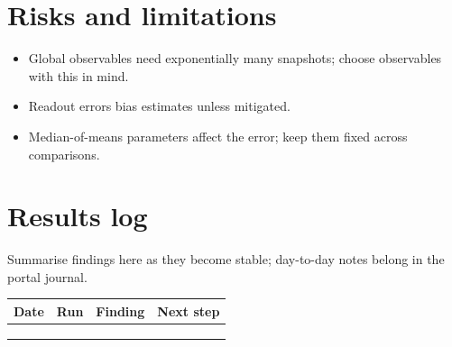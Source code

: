 \documentclass[11pt,a4paper]{article}
\begin{document}
\section{Risks and limitations}
\begin{itemize}
  \item Global observables need exponentially many snapshots; choose observables with this in mind.
  \item Readout errors bias estimates unless mitigated.
  \item Median-of-means parameters affect the error; keep them fixed across comparisons.
\end{itemize}

\section{Results log}
\label{sec:log}
Summarise findings here as they become stable; day-to-day notes belong in the portal journal.

\begin{table}[h]
\centering\small
\begin{tabularx}{\linewidth}{@{}l l >{\raggedright}X >{\raggedright\arraybackslash}X@{}}
\toprule
Date & Run & Finding & Next step \\
\midrule
 & & & \\
 & & & \\
 & & & \\
\bottomrule
\end{tabularx}
\end{table}



\end{document}
